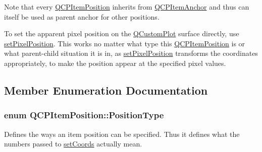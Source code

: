 Note that every \hyperlink{class_q_c_p_item_position}{Q\+C\+P\+Item\+Position} inherits from \hyperlink{class_q_c_p_item_anchor}{Q\+C\+P\+Item\+Anchor} and thus can itself be used as parent anchor for other positions.

To set the apparent pixel position on the \hyperlink{class_q_custom_plot}{Q\+Custom\+Plot} surface directly, use \hyperlink{class_q_c_p_item_position_a8d4f858f2089973967cf9cb81970ef0a}{set\+Pixel\+Position}. This works no matter what type this \hyperlink{class_q_c_p_item_position}{Q\+C\+P\+Item\+Position} is or what parent-\/child situation it is in, as \hyperlink{class_q_c_p_item_position_a8d4f858f2089973967cf9cb81970ef0a}{set\+Pixel\+Position} transforms the coordinates appropriately, to make the position appear at the specified pixel values. 

\subsection{Member Enumeration Documentation}
\subsubsection[{\texorpdfstring{Position\+Type}{PositionType}}]{\setlength{\rightskip}{0pt plus 5cm}enum {\bf Q\+C\+P\+Item\+Position\+::\+Position\+Type}}\hypertarget{class_q_c_p_item_position_aad9936c22bf43e3d358552f6e86dbdc8}{}\label{class_q_c_p_item_position_aad9936c22bf43e3d358552f6e86dbdc8}
Defines the ways an item position can be specified. Thus it defines what the numbers passed to \hyperlink{class_q_c_p_item_position_aa988ba4e87ab684c9021017dcaba945f}{set\+Coords} actually mean.

